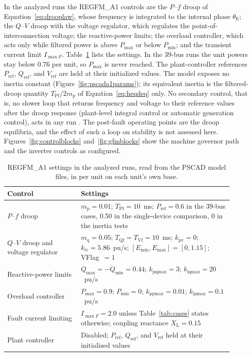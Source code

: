 \documentclass[11pt]{article}
\begin{document}
In the analyzed runs the REGFM\_A1 controls are the $P$--$f$ droop of Equation~\eqref{eq:drooplaw}, whose frequency is integrated to the internal phase $\theta_{\mathrm{E}}$; the $Q$--$V$ droop with the voltage regulator, which regulates the point-of-interconnection voltage; the reactive-power limits; the overload controller, which acts only while filtered power is above $P_{\max}$ or below $P_{\min}$; and the transient current limit $I_{\max F}$. Table~\ref{tab:a1settings} lists the settings. In the 39-bus runs the unit powers stay below 0.76 per unit, so $P_{\max}$ is never reached. The plant-controller references $P_{\mathrm{ref}}$, $Q_{\mathrm{ref}}$, and $V_{\mathrm{ref}}$ are held at their initialized values. The model exposes no inertia constant (Figure~\ref{fig:pscada1params}); its equivalent inertia is the filtered-droop quantity $T_{\mathrm{Pf}}/2m_{\mathrm{p}}$ of Equation~\eqref{eq:heqdeq} only. No secondary control, that is, no slower loop that returns frequency and voltage to their reference values after the droop response (plant-level integral control or automatic generation control), acts in any run \cite{du2023a1}. The post-fault operating points are the droop equilibria, and the effect of such a loop on stability is not assessed here. Figures~\ref{fig:controlblocks} and~\ref{fig:gfmblocks} show the machine governor path and the inverter controls as configured.

\begin{table}[tbp]\centering\small
\caption{REGFM\_A1 settings in the analyzed runs, read from the PSCAD model files, in per unit on each unit's own base.}
\label{tab:a1settings}
\begin{tabular}{>{\raggedright\arraybackslash}p{0.30\linewidth}>{\raggedright\arraybackslash}p{0.62\linewidth}}\toprule
Control & Settings\\\midrule
$P$--$f$ droop & $m_{\mathrm{p}}=0.01$; $T_{\mathrm{Pf}}=10$~ms; $P_{\mathrm{ref}}=0.6$ in the 39-bus cases, 0.50 in the single-device comparison, 0 in the inertia tests\\
$Q$--$V$ droop and voltage regulator & $m_{\mathrm{q}}=0.05$; $T_{\mathrm{Qf}}=T_{\mathrm{Vf}}=10$~ms; $k_{\mathrm{pv}}=0$; $k_{\mathrm{iv}}=5.86$~pu/s; $[E_{\min},E_{\max}]=[0,1.15]$; VFlag~$=1$\\
Reactive-power limits & $Q_{\max}=-Q_{\min}=0.44$; $k_{\mathrm{pqmax}}=3$; $k_{\mathrm{iqmax}}=20$~pu/s\\
Overload controller & $P_{\max}=0.9$; $P_{\min}=0$; $k_{\mathrm{ppmax}}=0.01$; $k_{\mathrm{ipmax}}=0.1$~pu/s\\
Fault current limiting & $I_{\max F}=2.0$ unless Table~\ref{tab:cases} states otherwise; coupling reactance $X_{\mathrm{L}}=0.15$\\
Plant controller & Disabled; $P_{\mathrm{ref}}$, $Q_{\mathrm{ref}}$, and $V_{\mathrm{ref}}$ held at their initialized values\\\bottomrule
\end{tabular}
\end{table}
\end{document}
